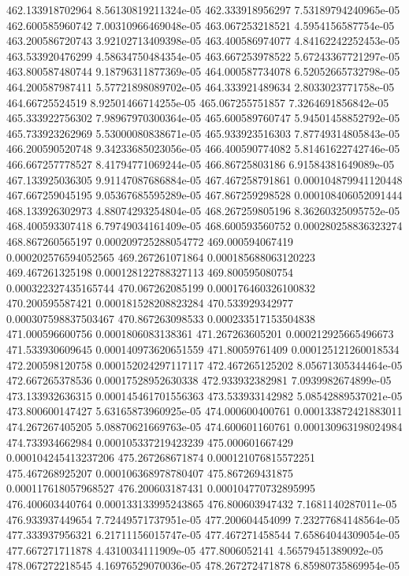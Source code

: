 {462.133918702964 8.56130819211324e-05
462.333918956297 7.53189794240965e-05
462.600585960742 7.00310966469048e-05
463.067253218521 4.5954156587754e-05
463.200586720743 3.92102713409398e-05
463.400586974077 4.84162242252453e-05
463.533920476299 4.58634750484354e-05
463.667253978522 5.67243367721297e-05
463.800587480744 9.18796311877369e-05
464.000587734078 6.52052665732798e-05
464.200587987411 5.57721898089702e-05
464.333921489634 2.8033023771758e-05
464.66725524519 8.92501466714255e-05
465.067255751857 7.3264691856842e-05
465.333922756302 7.98967970300364e-05
465.600589760747 5.94501458852792e-05
465.733923262969 5.53000080838671e-05
465.933923516303 7.87749314805843e-05
466.200590520748 9.34233685023056e-05
466.400590774082 5.81461622742746e-05
466.667257778527 8.41794771069244e-05
466.86725803186 6.91584381649089e-05
467.133925036305 9.91147087686884e-05
467.467258791861 0.000104879941120448
467.667259045195 9.05367685595289e-05
467.867259298528 0.000108406052091444
468.133926302973 4.88074293254804e-05
468.267259805196 8.36260325095752e-05
468.400593307418 6.79749034161409e-05
468.600593560752 0.000280258836323274
468.867260565197 0.000209725288054772
469.000594067419 0.000202576594052565
469.267261071864 0.000185688063120223
469.467261325198 0.000128122788327113
469.800595080754 0.000322327435165744
470.067262085199 0.000176460326100832
470.200595587421 0.000181528208823284
470.533929342977 0.000307598837503467
470.867263098533 0.000233517153504838
471.000596600756 0.0001806083138361
471.267263605201 0.000212925665496673
471.533930609645 0.000140973620651559
471.80059761409 0.000125121260018534
472.200598120758 0.000152024297117117
472.467265125202 8.05671305344464e-05
472.667265378536 0.00017528952630338
472.933932382981 7.0939982674899e-05
473.133932636315 0.000145461701556363
473.533933142982 5.08542889537021e-05
473.800600147427 5.63165873960925e-05
474.000600400761 0.000133872421883011
474.267267405205 5.08870621669763e-05
474.600601160761 0.000130963198024984
474.733934662984 0.000105337219423239
475.000601667429 0.000104245413237206
475.267268671874 0.000121076815572251
475.467268925207 0.000106368978780407
475.867269431875 0.000117618057968527
476.200603187431 0.000104770732895995
476.400603440764 0.000133133995243865
476.800603947432 7.1681140287011e-05
476.933937449654 7.72449571737951e-05
477.200604454099 7.23277684148564e-05
477.333937956321 6.21711156015747e-05
477.467271458544 7.65864044309054e-05
477.667271711878 4.4310034111909e-05
477.8006052141 4.56579451389092e-05
478.067272218545 4.16976529070036e-05
478.267272471878 6.85980735869954e-05
}
